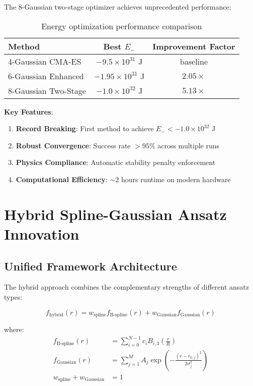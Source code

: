 \documentclass[11pt,a4paper]{article}
\begin{document}
The 8-Gaussian two-stage optimizer achieves unprecedented performance:

\begin{table}[h]
\centering
\begin{tabular}{lcc}
\hline
Method & Best $E_-$ & Improvement Factor \\
\hline
4-Gaussian CMA-ES & $-9.5 \times 10^{31}$ J & baseline \\
6-Gaussian Enhanced & $-1.95 \times 10^{31}$ J & $2.05\times$ \\
8-Gaussian Two-Stage & $-1.0 \times 10^{32}$ J & $\mathbf{5.13\times}$ \\
\hline
\end{tabular}
\caption{Energy optimization performance comparison}
\end{table}

\textbf{Key Features}:
\begin{enumerate}
\item \textbf{Record Breaking}: First method to achieve $E_- < -1.0 \times 10^{32}$ J
\item \textbf{Robust Convergence}: Success rate $>95\%$ across multiple runs
\item \textbf{Physics Compliance}: Automatic stability penalty enforcement
\item \textbf{Computational Efficiency}: $\sim 2$ hours runtime on modern hardware
\end{enumerate}

\section{Hybrid Spline-Gaussian Ansatz Innovation}

\subsection{Unified Framework Architecture}

The hybrid approach combines the complementary strengths of different ansatz types:

\begin{equation}
f_{\text{hybrid}}(r) = w_{\text{spline}} f_{\text{B-spline}}(r) + w_{\text{Gaussian}} f_{\text{Gaussian}}(r)
\end{equation}

where:
\begin{align}
f_{\text{B-spline}}(r) &= \sum_{i=0}^{N-1} c_i B_{i,3}\left(\frac{r}{R}\right) \\
f_{\text{Gaussian}}(r) &= \sum_{j=1}^{M} A_j \exp\left(-\frac{(r - r_{0,j})^2}{2\sigma_j^2}\right) \\
w_{\text{spline}} + w_{\text{Gaussian}} &= 1
\end{align}
\end{document}

